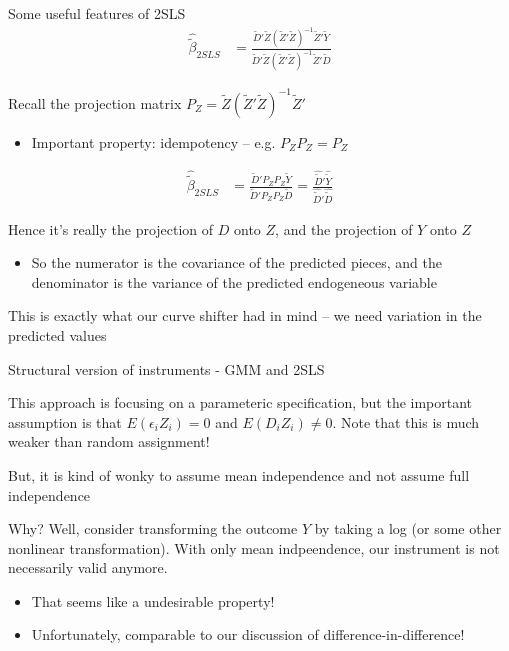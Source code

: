 \documentclass[notes,11pt, aspectratio=169]{beamer}
\newenvironment{wideitemize}{\itemize\addtolength{\itemsep}{10pt}}{\enditemize}
\begin{document}
\begin{frame}{Some useful features of 2SLS}
    \begin{align*}
      \hat{\widetilde{\beta}}_{2SLS} &= \frac{\widetilde{D}'\widetilde{Z} (\widetilde{Z}'\widetilde{Z})^{-1} \widetilde{Z}'\widetilde{Y}}{\widetilde{D}'\widetilde{Z} (\widetilde{Z}'\widetilde{Z})^{-1} \widetilde{Z}'\widetilde{D}}
    \end{align*}
  \begin{wideitemize}
  \item Recall the projection matrix
    $P_{Z} = \widetilde{Z} (\widetilde{Z}'\widetilde{Z})^{-1}
    \widetilde{Z}'$
    \begin{itemize}
    \item Important property: idempotency -- e.g. $P_{Z}P_{Z} = P_{Z}$
    \end{itemize}
    \begin{align*}
      \hat{\widetilde{\beta}}_{2SLS} &= \frac{\widetilde{D}'P_{Z}P_{Z}\widetilde{Y}}{\widetilde{D}'P_{Z}P_{Z}\widetilde{D}} = \frac{\hat{\widetilde{D}}'\hat{\widetilde{Y}}}{\hat{\widetilde{D}}'\hat{\widetilde{D}}} 
    \end{align*}
  \item Hence it's really the projection of $D$ onto $Z$, and the
    projection of $Y$ onto $Z$
    \begin{itemize}
    \item So the numerator is the covariance of the predicted pieces,
      and the denominator is the variance of the predicted endogeneous
      variable
    \end{itemize}
  \item This is exactly what our curve shifter had in mind -- we need
    variation in the predicted values
  \end{wideitemize}
\end{frame}

\begin{frame}{Structural version of instruments - GMM and 2SLS}
  \begin{wideitemize}
  \item This approach is focusing on a parameteric specification, but
    the important assumption is that $E(\epsilon_{i}Z_{i}) = 0$ and
    $E(D_{i}Z_{i}) \not=0$. Note that this is much weaker than random
    assignment!
  \item But, it is kind of wonky to assume mean independence and not
    assume full independence
  \item Why? Well, consider transforming the outcome $Y$ by taking a
    log (or some other nonlinear transformation). With only mean
    indpeendence, our instrument is not necessarily valid anymore.
    \begin{itemize}
    \item That seems like a undesirable property!
    \item Unfortunately, comparable to our discussion of difference-in-difference!
    \end{itemize}
  \end{wideitemize}
\end{frame}
\end{document}
